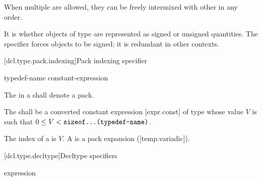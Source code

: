 \documentclass{wg21}
\begin{document}
\pnum
When multiple  are allowed, they can be
freely intermixed with other  in any order.
\begin{note}
    It is  whether objects of  type are
    represented as signed or unsigned quantities. The  specifier
    forces  objects to be signed; it is redundant in other contexts.
\end{note}




\begin{addedblock}

[dcl.type.pack.indexing]{Pack indexing specifier}

\begin{bnf}
    \br
    typedef-name  \terminal{[} constant-expression \terminal{]}  \br
\end{bnf}

The  in a  shall denote a pack.

The  shall be a converted constant expression [expr.const] of type  whose value $V$ is such that $0 \le V < \texttt{sizeof...(typedef-name)}$.

The index of a  is $V$.
A  is a pack expansion ([temp.variadic]).


\end{addedblock}



[dcl.type.decltype]{Decltype specifiers}%
%

\begin{bnf}
    \br
     \terminal{(} expression \terminal{)}
\end{bnf}
\end{document}
